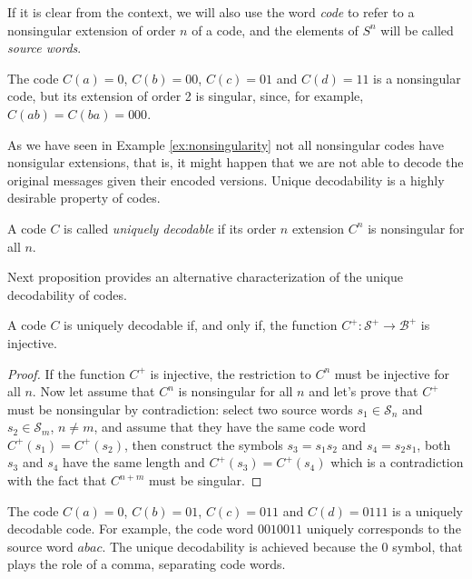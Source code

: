 If it is clear from the context, we will also use the word \emph{code} to refer to a nonsingular extension of order $n$ of a code, and the elements of $S^{n}$ will be called \emph{source words}.

\begin{example}
\label{ex:nonsingularity}
The code $C(a)=0$, $C(b)=00$, $C(c)=01$ and $C(d)=11$ is a nonsingular code, but its extension of order 2 is singular, since, for example, $C(ab)=C(ba)=000$.
\end{example}

As we have seen in Example \ref{ex:nonsingularity} not all nonsingular codes have nonsigular extensions, that is, it might happen that we are not able to decode the original messages given their encoded versions. Unique decodability is a highly desirable property of codes.

\begin{definition}
A code $C$ is called \emph{uniquely decodable} if its order $n$ extension $C^{n}$ is nonsingular for all $n$.
\end{definition}

Next proposition provides an alternative characterization of the unique decodability of codes.

\begin{proposition}
A code $C$ is uniquely decodable if, and only if, the function $C^{+}:\mathcal{S}^{+}\rightarrow\mathcal{B}^{+}$ is injective.
\end{proposition}
\begin{proof}
If the function $C^{+}$ is injective, the restriction to $C^{n}$ must be injective for all $n$. Now let assume that $C^{n}$ is nonsingular for all $n$ and let's prove that $C^{+}$ must be nonsingular by contradiction: select two source words $s_{1} \in \mathcal{S}_n$ and $s_{2} \in \mathcal{S}_m$, $n \neq m$, and assume that they have the same code word $C^{+}(s_{1}) = C^{+}(s_{2})$, then construct the symbols $s_{3} = s_{1}s_{2}$ and $s_{4} = s_{2}s_{1}$, both $s_{3}$ and $s_{4}$ have the same length and $C^{+}(s_{3}) = C^{+}(s_{4})$ which is a contradiction with the fact that $C^{n+m}$ must be singular.
\end{proof}

\begin{example}
\label{ex:uniquely-decodable}
The code $C(a)=0$, $C(b)=01$, $C(c)=011$ and $C(d)=0111$ is a uniquely decodable code. For example, the code word $0010011$ uniquely corresponds to the source word $abac$. The unique decodability is achieved because the $0$ symbol, that plays the role of a comma, separating code words.
\end{example}


